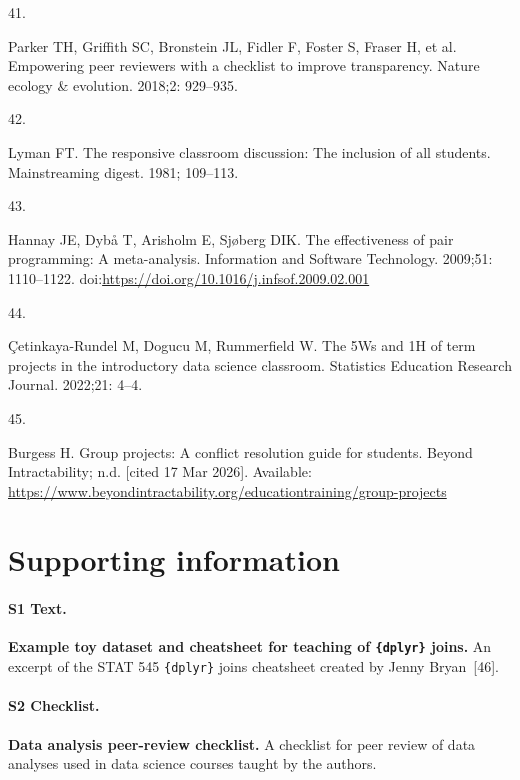 \documentclass[
  10pt,
  letterpaper,
]{article}
\newlength{\cslhangindent}
\newlength{\csllabelwidth}
\newenvironment{CSLReferences}[2] %
 {\begin{list}{}{%
  \setlength{\itemindent}{0pt}
  \setlength{\leftmargin}{0pt}
  \setlength{\parsep}{0pt}
  \ifodd #1
   \setlength{\leftmargin}{\cslhangindent}
   \setlength{\itemindent}{-1\cslhangindent}
  \fi
  \setlength{\itemsep}{#2\baselineskip}}}
 {\end{list}}
\newcommand{\CSLLeftMargin}[1]{\parbox[t]{\csllabelwidth}{\strut#1\strut}}
\newcommand{\CSLRightInline}[1]{\parbox[t]{\linewidth - \csllabelwidth}{\strut#1\strut}}
\begin{document}
\begin{CSLReferences}{0}{1}
\CSLLeftMargin{41. }%
\CSLRightInline{Parker TH, Griffith SC, Bronstein JL, Fidler F, Foster
S, Fraser H, et al. Empowering peer reviewers with a checklist to
improve transparency. Nature ecology \& evolution. 2018;2: 929--935. }

\CSLLeftMargin{42. }%
\CSLRightInline{Lyman FT. The responsive classroom discussion: The
inclusion of all students. Mainstreaming digest. 1981; 109--113. }

\CSLLeftMargin{43. }%
\CSLRightInline{Hannay JE, Dybå T, Arisholm E, Sjøberg DIK. The
effectiveness of pair programming: A meta-analysis. Information and
Software Technology. 2009;51: 1110--1122.
doi:\url{https://doi.org/10.1016/j.infsof.2009.02.001}}

\CSLLeftMargin{44. }%
\CSLRightInline{Çetinkaya-Rundel M, Dogucu M, Rummerfield W. The 5Ws and
1H of term projects in the introductory data science classroom.
Statistics Education Research Journal. 2022;21: 4--4. }

\CSLLeftMargin{45. }%
\CSLRightInline{Burgess H. Group projects: A conflict resolution guide
for students. Beyond Intractability; n.d. {[}cited 17 Mar 2026{]}.
Available:
\url{https://www.beyondintractability.org/educationtraining/group-projects}}

\end{CSLReferences}


\nolinenumbers

\newpage
\section*{Supporting information}

\paragraph*{S1 Text.}
\label{s1-text}
\textbf{Example toy dataset and cheatsheet for teaching of \texttt{\{dplyr\}} joins.} An excerpt of the STAT 545 \texttt{\{dplyr\}} joins cheatsheet created by Jenny Bryan~[46].

\paragraph*{S2 Checklist.}
\label{s2-checklist}
\textbf{Data analysis peer-review checklist.} A checklist for peer review of data analyses used in data science courses taught by the authors.
\end{document}
